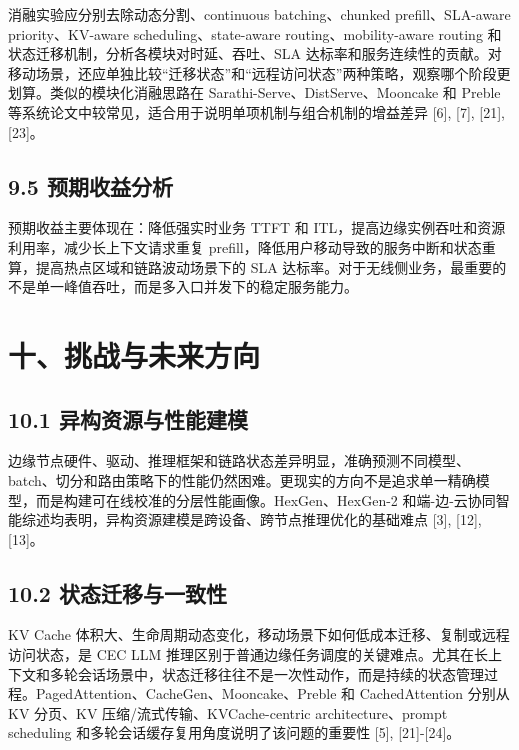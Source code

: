 \documentclass[a4paper,10pt]{ctexart}
\begin{document}
消融实验应分别去除动态分割、continuous batching、chunked prefill、SLA-aware priority、KV-aware scheduling、state-aware routing、mobility-aware routing 和状态迁移机制，分析各模块对时延、吞吐、SLA 达标率和服务连续性的贡献。对移动场景，还应单独比较“迁移状态”和“远程访问状态”两种策略，观察哪个阶段更划算。类似的模块化消融思路在 Sarathi-Serve、DistServe、Mooncake 和 Preble 等系统论文中较常见，适合用于说明单项机制与组合机制的增益差异 [6], [7], [21], [23]。


\subsection*{9.5 预期收益分析}

预期收益主要体现在：降低强实时业务 TTFT 和 ITL，提高边缘实例吞吐和资源利用率，减少长上下文请求重复 prefill，降低用户移动导致的服务中断和状态重算，提高热点区域和链路波动场景下的 SLA 达标率。对于无线侧业务，最重要的不是单一峰值吞吐，而是多入口并发下的稳定服务能力。


\section*{十、挑战与未来方向}

\subsection*{10.1 异构资源与性能建模}

边缘节点硬件、驱动、推理框架和链路状态差异明显，准确预测不同模型、batch、切分和路由策略下的性能仍然困难。更现实的方向不是追求单一精确模型，而是构建可在线校准的分层性能画像。HexGen、HexGen-2 和端-边-云协同智能综述均表明，异构资源建模是跨设备、跨节点推理优化的基础难点 [3], [12], [13]。


\subsection*{10.2 状态迁移与一致性}

KV Cache 体积大、生命周期动态变化，移动场景下如何低成本迁移、复制或远程访问状态，是 CEC LLM 推理区别于普通边缘任务调度的关键难点。尤其在长上下文和多轮会话场景中，状态迁移往往不是一次性动作，而是持续的状态管理过程。PagedAttention、CacheGen、Mooncake、Preble 和 CachedAttention 分别从 KV 分页、KV 压缩/流式传输、KVCache-centric architecture、prompt scheduling 和多轮会话缓存复用角度说明了该问题的重要性 [5], [21]-[24]。
\end{document}

